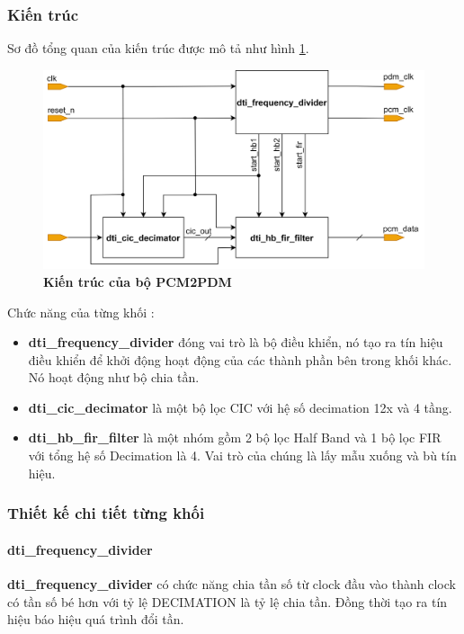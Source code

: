 \subsubsection{Kiến trúc}
Sơ đồ tổng quan của kiến trúc được mô tả như hình \ref{arc_top}.
\begin{figure}[H]
    \centering
    \includegraphics[width=13cm]{Images/Chuong4/arc_top.png}
    \caption[Kiến trúc của bộ PCM2PDM]{\bfseries \fontsize{12pt}{0pt}\selectfont Kiến trúc của bộ PCM2PDM}
    \label{arc_top}
\end{figure}

Chức năng của từng khối :
\begin{itemize}
    \item \textbf{dti\_frequency\_divider} đóng vai trò là bộ điều khiển, nó tạo ra tín hiệu điều khiển để khởi động hoạt động của các thành phần bên trong khối khác. Nó hoạt động như bộ chia tần.
    \item \textbf{dti\_cic\_decimator} là một bộ lọc CIC với hệ số decimation 12x và 4 tầng.
    \item \textbf{dti\_hb\_fir\_filter} là một nhóm gồm 2 bộ lọc Half Band và 1 bộ lọc FIR với tổng hệ số Decimation là 4. Vai trò của chúng là lấy mẫu xuống và bù tín hiệu.
\end{itemize}
\subsubsection{Thiết kế chi tiết từng khối}
\paragraph{dti\_frequency\_divider}
\textbf{dti\_frequency\_divider} có chức năng chia tần số từ clock đầu vào thành clock có tần số bé hơn với tỷ lệ DECIMATION là tỷ lệ chia tần. Đồng thời tạo ra tín hiệu báo hiệu quá trình đổi tần.

